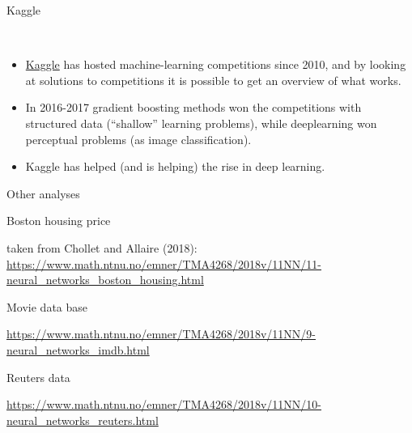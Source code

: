 \documentclass[10pt,ignorenonframetext,]{beamer}
\providecommand{\tightlist}{%
  \setlength{\itemsep}{0pt}\setlength{\parskip}{0pt}}
\begin{document}
\begin{frame}

\begin{block}{Kaggle}

\(~\)

\begin{itemize}
\tightlist
\item
  \href{https://www.kaggle.com/}{Kaggle} has hosted machine-learning
  competitions since 2010, and by looking at solutions to competitions
  it is possible to get an overview of what works.
\end{itemize}

\vspace{2mm}

\begin{itemize}
\tightlist
\item
  In 2016-2017 gradient boosting methods won the competitions with
  structured data (``shallow'' learning problems), while deeplearning
  won perceptual problems (as image classification).
\end{itemize}

\vspace{2mm}

\begin{itemize}
\tightlist
\item
  Kaggle has helped (and is helping) the rise in deep learning.
\end{itemize}

\end{block}

\end{frame}

\begin{frame}

\begin{block}{Other analyses}

\begin{block}{Boston housing price}

taken from Chollet and Allaire (2018):
\url{https://www.math.ntnu.no/emner/TMA4268/2018v/11NN/11-neural_networks_boston_housing.html}

\end{block}

\begin{block}{Movie data base}

\url{https://www.math.ntnu.no/emner/TMA4268/2018v/11NN/9-neural_networks_imdb.html}

\end{block}

\begin{block}{Reuters data}

\url{https://www.math.ntnu.no/emner/TMA4268/2018v/11NN/10-neural_networks_reuters.html}

\end{block}

\end{block}

\end{frame}
\end{document}
